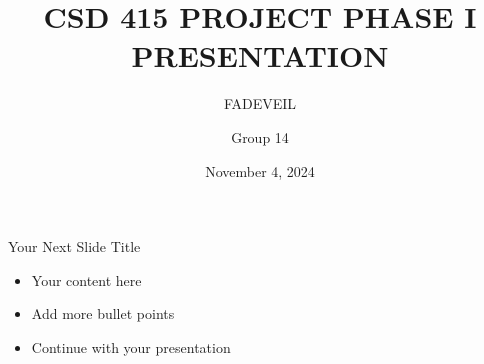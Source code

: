 \documentclass[aspectratio=1610]{beamer}
\title{CSD 415 PROJECT PHASE I PRESENTATION}
\subtitle{FADEVEIL}
\author{Group 14}
\date{November 4, 2024}
\begin{document}
\begin{frame}
  \titlepage
\end{frame}

\begin{frame}{Your Next Slide Title}
  \begin{itemize}
    \item Your content here
    \item Add more bullet points
    \item Continue with your presentation
  \end{itemize}
\end{frame}
\end{document}
